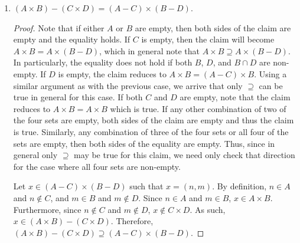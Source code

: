 \documentclass[12pt]{article}
\begin{document}
\begin{enumerate}[label=(\alph*)]
\begin{proof}
		Let $y \in (A \times C - B \times C) - A \times D$ such that $y = (n, m)$. 
		By definition, $n \in A$ and $m \in C$. Since $y \notin B \times C$ and 
		$m \in C$ it must be that $n \notin B$. Furthermore, since $y \notin A \times D$
		and $n \in A$, it must be that $m \notin D$. In particular, since $n \in A$ and 
		$n \notin B$, $n \in A - B$. Further, since $m \in C$ and $m \notin D$, 
		$m \in C - D$. Therefore, $y \in (A - B) \times (C - D)$. Hence, we conclude that
		$(A \times C - B \times C) - A \times D \subseteq (A - B) \times (C - D)$.
		Therefore, we conclude that $(A - B) \times (C - D) = (A \times C - B \times C)
		- A \times D$. 
	\end{proof}
	\item $(A \times B) - (C \times D) = (A - C) \times (B - D)$.
	\begin{proof}
		Note that if either $A$ or $B$ are empty, then both sides of the claim are empty
		and the equality holds. If $C$ is empty, then the claim will become
		$A \times B = A \times (B - D)$, which in general note that $A \times B
		\supseteq A \times (B - D)$. In particularly, the equality does not hold
		if both $B$, $D$, and $B \cap D$ are non-empty. If $D$ is empty, the claim
		reduces to $A \times B = (A - C) \times B$. Using a similar argument as 
		with the previous case, we arrive that only $\supseteq$ can be true in general
		for this case. If both $C$ and $D$ are empty, note that the claim reduces 
		to $A \times B = A \times B$ which is true. If any other combination of two
		of the four sets are empty, both sides of the claim are empty and thus the claim is 
		true. Similarly, any combination of three of the four sets or all four of the 
		sets are empty, then both sides of the equality are empty. Thus, since in general
		only $\supseteq$ may be true for this claim, we need only check that direction
		for the case where all four sets are non-empty.
		
		Let $x \in (A - C) \times (B - D)$ such that $x = (n, m)$. By definition,
		$n \in A$ and $n \notin C$, and $m \in B$ and $m \notin D$. Since 
		$n \in A$ and $m \in B$, $x \in A \times B$. Furthermore, since 
		$n \notin C$ and $m \notin D$, $x \notin C \times D$. As such, 
		$x \in (A \times B) - (C \times D)$. Therefore, $(A \times B) - (C \times D) 
		\supseteq (A - C) \times (B - D)$.
	\end{proof} 
\end{enumerate}
\end{document}
